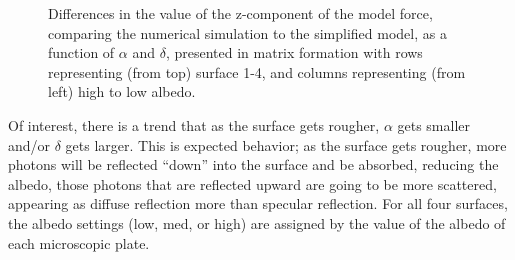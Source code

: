 \begin{description}
\begin{figure}[!ht]
\begin{minipage}[t]{200mm}
  \end{minipage}
    \caption{Differences in the value of the z-component of the model force, comparing the
    numerical simulation to
    the simplified model, as a function of $\alpha$ and $\delta$,
    presented in matrix formation with rows representing (from top) surface
    1-4, and columns representing (from left) high to low albedo.}
    \label{fig:ivv_sda_alpha_delta_Fz}
  \end{figure}
      Of interest, there is a trend that as the surface gets rougher, $\alpha
      $ gets smaller and/or  $\delta $ gets larger.  This is expected behavior; as the surface gets rougher, more photons will be reflected ``down'' into the surface and be absorbed, reducing the albedo, those photons that are reflected upward are going to be more scattered, appearing as diffuse reflection more than specular reflection.
      For all four surfaces, the albedo settings (low, med, or
      high) are assigned by the value of the albedo of each
      microscopic plate.

  \end{description}

  \clearpage


